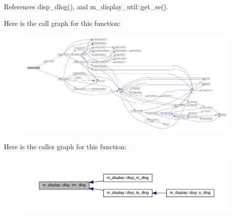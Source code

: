 References disp\+\_\+dlog(), and m\+\_\+display\+\_\+util\+::get\+\_\+se().

Here is the call graph for this function\+:
\nopagebreak
\begin{figure}[H]
\begin{center}
\leavevmode
\includegraphics[width=350pt]{namespacem__display_a0b5f8c9a84f77bedd9b8e6cd6bb8a093_cgraph}
\end{center}
\end{figure}
Here is the caller graph for this function\+:
\nopagebreak
\begin{figure}[H]
\begin{center}
\leavevmode
\includegraphics[width=350pt]{namespacem__display_a0b5f8c9a84f77bedd9b8e6cd6bb8a093_icgraph}
\end{center}
\end{figure}
\mbox{\label{namespacem__display_ae12795b79f66ff0f9f6843b2f980394a}} 
